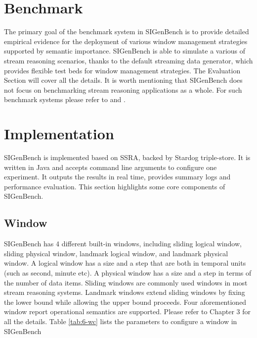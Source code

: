 \section{Benchmark}
The primary goal of the benchmark system in SIGenBench is to provide detailed empirical evidence for the deployment of various window management strategies supported by semantic importance.
SIGenBench is able to simulate a various of stream reasoning scenarios, thanks to the default streaming data generator, which provides flexible test beds for window management strategies.
The Evaluation Section will cover all the details.
It is worth mentioning that SIGenBench does not focus on benchmarking stream reasoning applications as a whole.
For such benchmark systems please refer to \cite{dell2013correctness} \cite{ali2015citybench} \cite{tommasini2015heaven} and \cite{benchmarkdemo}.
%
\section{Implementation}
SIGenBench is implemented based on SSRA, backed by Stardog triple-store.
It is written in Java and accepts command line arguments to configure one experiment. 
It outputs the results in real time, provides summary logs and performance evaluation.
This section highlights some core components of SIGenBench. 
%
\subsection{Window}
SIGenBench has 4 different built-in windows, including sliding logical window, sliding physical window, landmark logical window, and landmark physical window. 
A logical window has a size and a step that are both in temporal units (such as second, minute etc).
A physical window has a size and a step in terms of the number of data items. 
Sliding windows are commonly used windows in most stream reasoning systems. 
Landmark windows extend sliding windows by fixing the lower bound while allowing the upper bound proceeds.
Four aforementioned window report operational semantics are supported.
Please refer to Chapter 3 for all the details. 
Table \ref{tab:6-wc} lists the parameters to configure a window in SIGenBench

